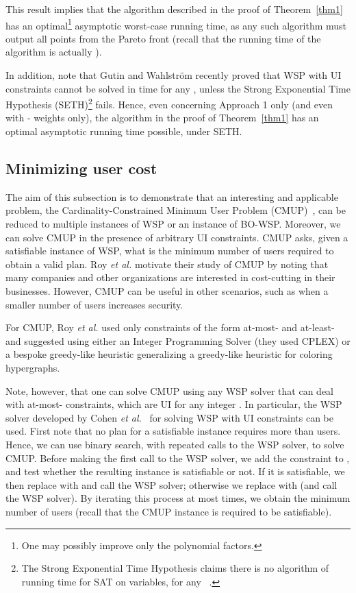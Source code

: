 \documentclass[jcs,crcready]{iosart1c}
\begin{document}
This result implies that the algorithm described in the proof of Theorem~\ref{thm1} has an optimal\footnote{One may possibly improve only the polynomial factors.} asymptotic worst-case running time, as any such algorithm must output all points from the Pareto front (recall that the running time of the algorithm is actually ).

In addition, note that Gutin and Wahlstr{\"o}m  \cite{GutinW15} recently proved that WSP with UI constraints cannot be solved in time  for any , unless the Strong Exponential Time Hypothesis (SETH)\footnote{The Strong Exponential Time Hypothesis claims there is no algorithm of running time  for SAT on  variables, for any ~\cite{ImPaZa01}.} fails. Hence, even concerning Approach 1 only (and even with - weights only), the algorithm in the proof of Theorem~\ref{thm1} has an optimal asymptotic running time possible, under SETH.


\subsection{Minimizing user cost}\label{sec:mup}

The aim of this subsection is to demonstrate that an interesting and applicable problem, the Cardinality-Constrained Minimum User Problem (CMUP)~\cite{Roy2015}, can be reduced to multiple instances of WSP or an instance of BO-WSP.
Moreover, we can solve CMUP in the presence of arbitrary UI constraints.
CMUP asks, given a satisfiable instance of WSP, what is the minimum number of users required to obtain a valid plan. 
Roy {\em et al.} \cite{Roy2015} motivate their study of CMUP by noting that many companies and other organizations are interested in cost-cutting in their businesses. 
However, CMUP can be useful in other scenarios, such as when a smaller number of users increases security.  

For CMUP, Roy {\em et al.} \cite{Roy2015} used only constraints of the form at-most- and at-least- and suggested using either an Integer Programming Solver (they used CPLEX) or a bespoke greedy-like heuristic generalizing a greedy-like heuristic for coloring hypergraphs. 

Note, however, that one can solve CMUP using any WSP solver that can deal with at-most- constraints, which are UI for any integer .
In particular, the WSP solver developed by Cohen {\em et al.}~\cite{CoCrGaGuJo14c,KaGaGu} for solving WSP with UI constraints can be used. 
First note that no plan for a satisfiable instance requires more than  users.
Hence, we can use binary search, with repeated calls to the WSP solver, to solve CMUP.
Before making the first call to the WSP solver, we add the constraint  to , and test whether the resulting instance is satisfiable or not. 
If it is satisfiable, we then replace  with  and call the WSP solver; otherwise we replace  with  (and call the WSP solver).
By iterating this process at most  times, we obtain the minimum number of users (recall that the CMUP instance is required to be satisfiable).
\end{document}
